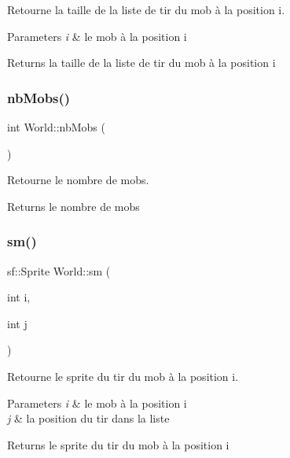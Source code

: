 Retourne la taille de la liste de tir du mob à la position i. 


\begin{DoxyParams}{Parameters}
{\em i} & le mob à la position i \\
\hline
\end{DoxyParams}
\begin{DoxyReturn}{Returns}
la taille de la liste de tir du mob à la position i 
\end{DoxyReturn}
\mbox{\label{classWorld_a78c5310cba881f2a5ae27def30b56222}} 
\subsubsection{\texorpdfstring{nb\+Mobs()}{nbMobs()}}
{\footnotesize\ttfamily int World\+::nb\+Mobs (\begin{DoxyParamCaption}{ }\end{DoxyParamCaption})}



Retourne le nombre de mobs. 

\begin{DoxyReturn}{Returns}
le nombre de mobs 
\end{DoxyReturn}
\mbox{\label{classWorld_a568baaaf16893722fb4102c261c5e17e}} 
\subsubsection{\texorpdfstring{sm()}{sm()}}
{\footnotesize\ttfamily sf\+::\+Sprite World\+::sm (\begin{DoxyParamCaption}\item[{int}]{i,  }\item[{int}]{j }\end{DoxyParamCaption})}



Retourne le sprite du tir du mob à la position i. 


\begin{DoxyParams}{Parameters}
{\em i} & le mob à la position i \\
\hline
{\em j} & la position du tir dans la liste \\
\hline
\end{DoxyParams}
\begin{DoxyReturn}{Returns}
le sprite du tir du mob à la position i 
\end{DoxyReturn}
\mbox{\label{classWorld_a22d26a89c5c09fb408733518b4cd696d}} 
